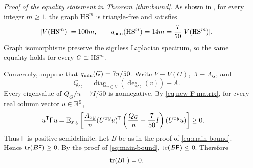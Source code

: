\noindent\emph{Proof of the equality statement in Theorem~\ref{thm:bound}.}
As shown in \cite{deLimaNikiforovOliveira}, for every integer
$m\geq1$, the graph $\mathrm{HS}^m$ is triangle-free and satisfies
\[
|V(\mathrm{HS}^m)|=100m,
\qquad q_{\min}(\mathrm{HS}^m)=14m=\frac7{50}|V(\mathrm{HS}^m)|.
\]
Graph isomorphisms preserve the signless Laplacian spectrum, so the
same equality holds for every $G\cong \mathrm{HS}^m$.

Conversely, suppose that $q_{\min}(G)=7n/50$.
Write $V=V(G)$, $A=A_G$, and
\[
Q_G=\operatorname{diag}_{v\in V}(\deg_G(v))+A.
\]
Every eigenvalue of $Q_G/n-7I/50$ is nonnegative.
By \eqref{eq:new-F-matrix}, for every real column vector $u\in\mathbb R^5$,
\begin{align*}
u^{\mathsf T}\mathsf F u
&=\mathbb E_{x,y}\left[
\frac{A_{xy}}n
(U^{xy}u)^{\mathsf T}
\left(\frac{Q_G}n-\frac7{50}I\right)
(U^{xy}u)\right]\geq0.
\end{align*}
Thus $\mathsf F$ is positive semidefinite.
Let $B$ be as in the proof of \eqref{eq:main-bound}.
Hence $\operatorname{tr}(B\mathsf F)\geq0$.
By the proof of \eqref{eq:main-bound}, $\operatorname{tr}(B\mathsf F)\leq0$.
Therefore
\begin{equation}\label{eq:equality-zero-trace}
\operatorname{tr}(B\mathsf F)=0.
\end{equation}


